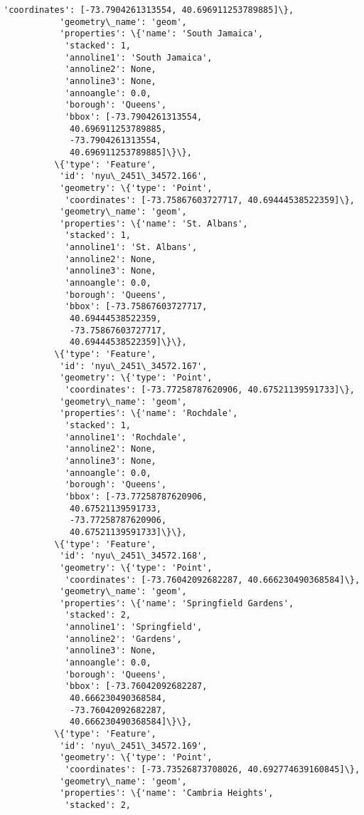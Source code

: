 \documentclass[11pt]{article}
\begin{document}
\begin{Verbatim}[commandchars=\\\{\}]
            'coordinates': [-73.7904261313554, 40.696911253789885]\},
           'geometry\_name': 'geom',
           'properties': \{'name': 'South Jamaica',
            'stacked': 1,
            'annoline1': 'South Jamaica',
            'annoline2': None,
            'annoline3': None,
            'annoangle': 0.0,
            'borough': 'Queens',
            'bbox': [-73.7904261313554,
             40.696911253789885,
             -73.7904261313554,
             40.696911253789885]\}\},
          \{'type': 'Feature',
           'id': 'nyu\_2451\_34572.166',
           'geometry': \{'type': 'Point',
            'coordinates': [-73.75867603727717, 40.69444538522359]\},
           'geometry\_name': 'geom',
           'properties': \{'name': 'St. Albans',
            'stacked': 1,
            'annoline1': 'St. Albans',
            'annoline2': None,
            'annoline3': None,
            'annoangle': 0.0,
            'borough': 'Queens',
            'bbox': [-73.75867603727717,
             40.69444538522359,
             -73.75867603727717,
             40.69444538522359]\}\},
          \{'type': 'Feature',
           'id': 'nyu\_2451\_34572.167',
           'geometry': \{'type': 'Point',
            'coordinates': [-73.77258787620906, 40.67521139591733]\},
           'geometry\_name': 'geom',
           'properties': \{'name': 'Rochdale',
            'stacked': 1,
            'annoline1': 'Rochdale',
            'annoline2': None,
            'annoline3': None,
            'annoangle': 0.0,
            'borough': 'Queens',
            'bbox': [-73.77258787620906,
             40.67521139591733,
             -73.77258787620906,
             40.67521139591733]\}\},
          \{'type': 'Feature',
           'id': 'nyu\_2451\_34572.168',
           'geometry': \{'type': 'Point',
            'coordinates': [-73.76042092682287, 40.666230490368584]\},
           'geometry\_name': 'geom',
           'properties': \{'name': 'Springfield Gardens',
            'stacked': 2,
            'annoline1': 'Springfield',
            'annoline2': 'Gardens',
            'annoline3': None,
            'annoangle': 0.0,
            'borough': 'Queens',
            'bbox': [-73.76042092682287,
             40.666230490368584,
             -73.76042092682287,
             40.666230490368584]\}\},
          \{'type': 'Feature',
           'id': 'nyu\_2451\_34572.169',
           'geometry': \{'type': 'Point',
            'coordinates': [-73.73526873708026, 40.692774639160845]\},
           'geometry\_name': 'geom',
           'properties': \{'name': 'Cambria Heights',
            'stacked': 2,

\end{Verbatim}
\end{document}

